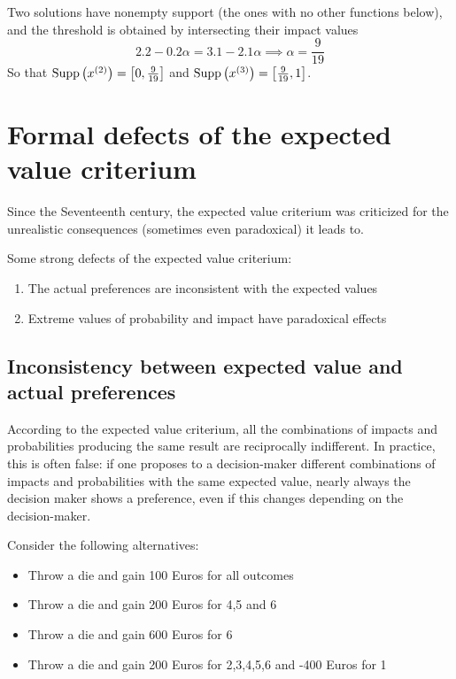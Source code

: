 Two solutions have nonempty support (the ones with no other functions below), and the threshold is obtained by intersecting their impact values
$$ 2.2 - 0.2 \alpha = 3.1 - 2.1 \alpha \implies \alpha = \frac{9}{19} $$
So that $\operatorname{Supp}\left(x^{(2)}\right) = \left[0, \frac{9}{19}\right]$ and $\operatorname{Supp}\left(x^{(3)}\right) = \left[\frac{9}{19}, 1\right]$.

\section{Formal defects of the expected value criterium}
\label{sec:formdefexpectedvalue}

Since the Seventeenth century, the expected value criterium was criticized for the unrealistic consequences (sometimes even paradoxical) it leads to.

Some strong defects of the expected value criterium:
\begin{enumerate}
	\item The actual preferences are inconsistent with the expected values
	
	\item Extreme values of probability and impact have paradoxical effects
\end{enumerate}

\subsection{Inconsistency between expected value and actual preferences}

According to the expected value criterium, all the combinations of impacts and probabilities producing the same result are reciprocally indifferent. In practice, this is often false: if one proposes to a decision-maker different combinations of impacts and probabilities with the same expected value, nearly always the decision maker shows a preference, even if this changes depending on the decision-maker. 

Consider the following alternatives:
\begin{itemize}
	\item Throw a die and gain 100 Euros for all outcomes
	
	\item Throw a die and gain 200 Euros for 4,5 and 6
	
	\item Throw a die and gain 600 Euros for 6
	
	\item Throw a die and gain 200 Euros for 2,3,4,5,6 and -400 Euros for 1
\end{itemize}

